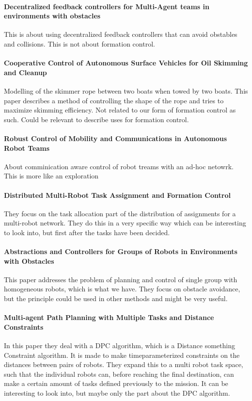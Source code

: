 {\vskip0pt\color{gray}
\paragraph{Decentralized feedback controllers for Multi-Agent teams in environments with obstacles}
	This is about using decentralized feedback controllers that can
	avoid obstables and collisions. This is not about formation control.}

{\vskip0pt\color{gray}
\paragraph{Cooperative Control of Autonomous Surface Vehicles for Oil Skimming and Cleanup}
	Modelling of the skimmer rope between two boats when towed by two
	boats. This paper describes a method of controlling the shape of the
	rope and tries to maximize skimming efficiency. Not related to our
	form of formation control as such. Could be relevant to describe uses for
    formation control.}

{\vskip0pt\color{gray}
\paragraph{Robust Control of Mobility and Communications in Autonomous Robot Teams}
	About comminication aware control of robot treams with an ad-hoc
	netowrk. This is more like an exploration}

\paragraph{Distributed Multi-Robot Task Assignment and Formation Control}
They focus on the task allocation part of the distribution of assignments for a multi-robot network. They do this in a very specific way which can be interesting to look into, but first after the tasks have been decided. \citep{MicZavKum0805}

\paragraph{Abstractions and Controllers for Groups of Robots in Environments with Obstacles}
This paper addresses the problem of planning and control of single group with homogeneous robots, which is what we have. They focus on obstacle avoidance, but the principle could be used in other methods and might be very useful. \citep{ayanian2010abstractions}

\paragraph{Multi-agent Path Planning with Multiple Tasks and Distance Constraints}
In this paper they deal with a DPC algorithm, which is a Distance something Constraint algorithm. It is made to make timeparameterized constraints on the distances between pairs of robots. They expand this to a multi robot task space, such that the individual robots can, before reaching the final destination, can make a certain amount of tasks defined previously to the mission.
It can be interesting to look into, but maybe only the part about the DPC algorithm. \citep{Planning:ICRA:10}

